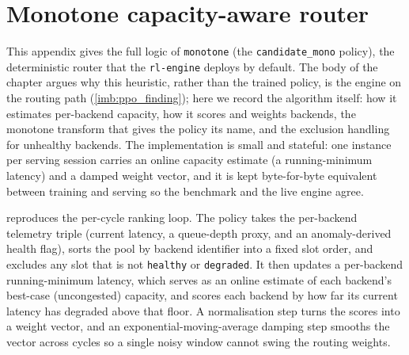 \section{Monotone capacity-aware router}
\label{bm:alg:monotone}

This appendix gives the full logic of \texttt{monotone} (the
\texttt{candidate\_mono} policy), the deterministic router that the
\texttt{rl-engine} deploys by default. The body of the chapter argues why this
heuristic, rather than the trained policy, is the engine on the routing path
(\cref{imb:ppo_finding}); here we record the algorithm itself: how it estimates
per-backend capacity, how it scores and weights backends, the monotone transform
that gives the policy its name, and the exclusion handling for unhealthy
backends. The implementation is small and stateful: one instance per serving
session carries an online capacity estimate (a running-minimum latency) and a
damped weight vector, and it is kept byte-for-byte equivalent between training
and serving so the benchmark and the live engine agree.

 reproduces the per-cycle ranking loop. The policy takes
the per-backend telemetry triple (current latency, a queue-depth proxy, and an
anomaly-derived health flag), sorts the pool by backend identifier into a fixed
slot order, and excludes any slot that is not \texttt{healthy} or
\texttt{degraded}. It then updates a per-backend running-minimum latency, which
serves as an online estimate of each backend's best-case (uncongested)
capacity, and scores each backend by how far its current latency has degraded
above that floor. A normalisation step turns the scores into a weight vector,
and an exponential-moving-average damping step smooths the vector across cycles
so a single noisy window cannot swing the routing weights.

